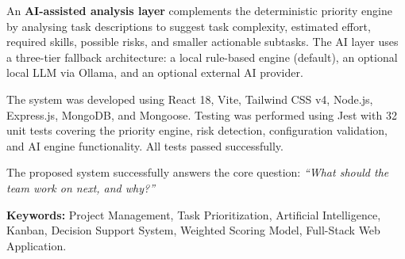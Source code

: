 \documentclass[12pt,a4paper,oneside]{report}
\begin{document}
An \textbf{AI-assisted analysis layer} complements the deterministic priority engine by analysing task descriptions to suggest task complexity, estimated effort, required skills, possible risks, and smaller actionable subtasks. The AI layer uses a three-tier fallback architecture: a local rule-based engine (default), an optional local LLM via Ollama, and an optional external AI provider.

The system was developed using React 18, Vite, Tailwind CSS v4, Node.js, Express.js, MongoDB, and Mongoose. Testing was performed using Jest with 32 unit tests covering the priority engine, risk detection, configuration validation, and AI engine functionality. All tests passed successfully.

The proposed system successfully answers the core question: \textit{``What should the team work on next, and why?''}

\textbf{Keywords:} Project Management, Task Prioritization, Artificial Intelligence, Kanban, Decision Support System, Weighted Scoring Model, Full-Stack Web Application.
\thispagestyle{plain}

\newpage
\tableofcontents
\thispagestyle{plain}

\newpage
\listoftables
\thispagestyle{plain}

\newpage
\listoffigures
\thispagestyle{plain}
\end{document}
